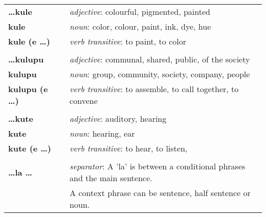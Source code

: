 \begin{supertabular}{p{2,5cm}|ll}
    \textbf{\dots kule}          &  & \textit{adjective}: colourful, pigmented, painted                                                          \\
    \textbf{kule}                &  & \textit{noun}: color, colour, paint, ink, dye, hue                                                         \\
    \textbf{kule (e \dots)}      &  & \textit{verb transitive}: to paint, to color                                                               \\
                                 &  &                                                                                                            \\
    \textbf{\dots kulupu}        &  & \textit{adjective}: communal, shared, public, of the society                                               \\
    \textbf{kulupu}              &  & \textit{noun}: group, community, society, company, people                                                  \\
    \textbf{kulupu (e \dots)}    &  & \textit{verb transitive}: to assemble, to call together, to convene                                        \\
                                 &  &                                                                                                            \\
    \textbf{\dots kute}          &  & \textit{adjective}: auditory, hearing                                                                      \\
    \textbf{kute}                &  & \textit{noun}: hearing, ear                                                                                \\
    \textbf{kute (e \dots)}      &  & \textit{verb transitive}: to hear, to listen,                                                              \\
                                 &  &                                                                                                            \\
    \textbf{\dots la \dots}      &  & \textit{separator}:  A 'la' is between a conditional phrases and the main sentence.                        \\
                                 &  & A context phrase can be sentence, half sentence or noun.                                                   \\

\end{supertabular}
